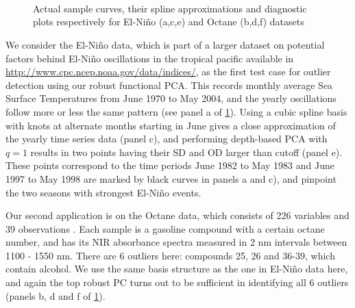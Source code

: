 \begin{figure}
\begin{center}
\\

\\

\\
\caption{Actual sample curves, their spline approximations and diagnostic plots respectively for El-Ni\~no (a,c,e) and Octane (b,d,f) datasets}
\label{fig:fPCAfig}
\end{center}
\end{figure}

We consider the El-Ni\~no data, which is part of a larger dataset on potential factors behind El-Ni\~no oscillations in the tropical pacific available in \url{http://www.cpc.ncep.noaa.gov/data/indices/}, as the first test case for outlier detection using our robust functional PCA. This records monthly average Sea Surface Temperatures from June 1970 to May 2004, and the yearly oscillations follow more or less the same pattern (see panel a of \ref{fig:fPCAfig}). Using a cubic spline basis with knots at alternate months starting in June gives a close approximation of the yearly time series data (panel c), and performing depth-based PCA with $q=1$ results in two points having their SD and OD larger than cutoff (panel e). These points correspond to the time periods June 1982 to May 1983 and June 1997 to May 1998 are marked by black curves in panels a and c), and pinpoint the two seasons with strongest El-Ni\~no events.

Our second application is on the Octane data, which consists of 226 variables and 39 observations \citep{esbensen94}. Each sample is a gasoline compound with a certain octane number, and has its NIR absorbance spectra measured in 2 nm intervals between 1100 - 1550 nm. There are 6 outliers here: compounds 25, 26 and 36-39, which contain alcohol. We use the same basis structure as the one in El-Ni\~no data here, and again the top robust PC turns out to be sufficient in identifying all 6 outliers (panels b, d and f of \ref{fig:fPCAfig}).
